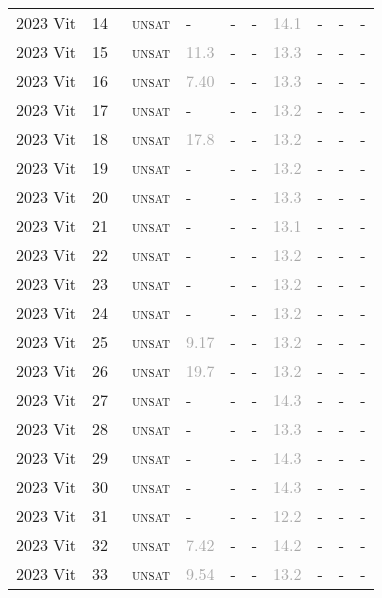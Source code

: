 \begin{center}
{\begin{longtable}{@{}llllllllll@{}}
2023 Vit & 14 & ~\textsc{unsat} & - & - & - & \textcolor{darkgray}{14.1} & - & - & - \\
2023 Vit & 15 & ~\textsc{unsat} & \textcolor{darkgray}{11.3} & - & - & \textcolor{darkgray}{13.3} & - & - & - \\
2023 Vit & 16 & ~\textsc{unsat} & \textcolor{darkgray}{7.40} & - & - & \textcolor{darkgray}{13.3} & - & - & - \\
2023 Vit & 17 & ~\textsc{unsat} & - & - & - & \textcolor{darkgray}{13.2} & - & - & - \\
2023 Vit & 18 & ~\textsc{unsat} & \textcolor{darkgray}{17.8} & - & - & \textcolor{darkgray}{13.2} & - & - & - \\
2023 Vit & 19 & ~\textsc{unsat} & - & - & - & \textcolor{darkgray}{13.2} & - & - & - \\
2023 Vit & 20 & ~\textsc{unsat} & - & - & - & \textcolor{darkgray}{13.3} & - & - & - \\
2023 Vit & 21 & ~\textsc{unsat} & - & - & - & \textcolor{darkgray}{13.1} & - & - & - \\
2023 Vit & 22 & ~\textsc{unsat} & - & - & - & \textcolor{darkgray}{13.2} & - & - & - \\
2023 Vit & 23 & ~\textsc{unsat} & - & - & - & \textcolor{darkgray}{13.2} & - & - & - \\
2023 Vit & 24 & ~\textsc{unsat} & - & - & - & \textcolor{darkgray}{13.2} & - & - & - \\
2023 Vit & 25 & ~\textsc{unsat} & \textcolor{darkgray}{9.17} & - & - & \textcolor{darkgray}{13.2} & - & - & - \\
2023 Vit & 26 & ~\textsc{unsat} & \textcolor{darkgray}{19.7} & - & - & \textcolor{darkgray}{13.2} & - & - & - \\
2023 Vit & 27 & ~\textsc{unsat} & - & - & - & \textcolor{darkgray}{14.3} & - & - & - \\
2023 Vit & 28 & ~\textsc{unsat} & - & - & - & \textcolor{darkgray}{13.3} & - & - & - \\
2023 Vit & 29 & ~\textsc{unsat} & - & - & - & \textcolor{darkgray}{14.3} & - & - & - \\
2023 Vit & 30 & ~\textsc{unsat} & - & - & - & \textcolor{darkgray}{14.3} & - & - & - \\
2023 Vit & 31 & ~\textsc{unsat} & - & - & - & \textcolor{darkgray}{12.2} & - & - & - \\
2023 Vit & 32 & ~\textsc{unsat} & \textcolor{darkgray}{7.42} & - & - & \textcolor{darkgray}{14.2} & - & - & - \\
2023 Vit & 33 & ~\textsc{unsat} & \textcolor{darkgray}{9.54} & - & - & \textcolor{darkgray}{13.2} & - & - & - \\

\end{longtable}}
\end{center}
